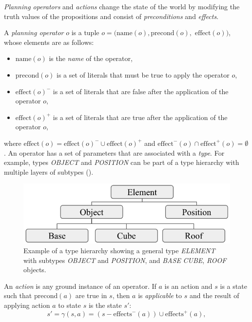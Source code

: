 \textit{Planning operators} and \textit{actions} change the state of the world by modifying the truth values of the propositions and consist of \textit{preconditions} and \textit{effects}.

\begin{definition}\label{def:operator}
A \textit{planning operator} $o$ is a tuple $o = (\text{name}(o), \text{precond}(o),$ $\text{effect}(o))$, whose elements are as follows:
\begin{itemize}
	\item $\text{name}(o)$ is the {\em name} of the operator,
	\item $\text{precond}(o)$ is a set of literals that must be true to apply the operator $o$,
	\item $\text{effect}(o)^{-}$ is a set of literals that are false after the application of the operator $o$,
	\item $\text{effect}(o)^{+}$ is a set of literals that are true after the application of the operator $o$,
\end{itemize}
\end{definition}
where $\text{effect}(o) = \text{effect}(o)^{-} \cup \text{effect}(o)^{+}$ and $\text{effect}^{-}(o) \cap \text{effect}^{+}(o) = \emptyset$. 
An operator has a set of parameters that are associated with a \textit{type}.
For example, types \textit{OBJECT} and \textit{POSITION} can be part of a type hierarchy with multiple layers of subtypes (). %

\begin{figure}[ht]
	\centering
	\includegraphics[width=0.7\linewidth]{figures/object-type-hierarchy}
	\caption{Example of a type hierarchy showing a general type \textit{ELEMENT} with subtypes \textit{OBJECT} and \textit{POSITION}, and \textit{BASE} \textit{CUBE}, \textit{ROOF} objects.}
	\label{fig:object-type-hierarchy}
\end{figure}


\begin{definition}\label{def:action}
	An \textit{action} is any ground instance of an operator. 
	If $a$ is an action and $s$ is a state such that $\text{precond}(a)$ are true in $s$, then $a$ is {\em applicable} to $s$ and the result of applying action $a$ to state $s$ is the state $s'$:  
	\begin{equation}\label{eq:statetrans}
		s' = \gamma(s, a) = (s - \text{effects}^{-}(a)) \cup \text{effects}^{+}(a),
	\end{equation}
	
\end{definition}

